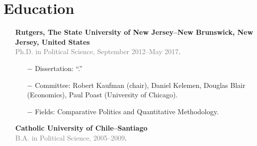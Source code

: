 \section*{Education}

\begin{itemize}
  \item[\textcolor{gray}{\textbullet}] {\bf Rutgers, The State University of New Jersey--New Brunswick, New Jersey, United States}\\
  \textcolor{gray}{Ph.D. in Political Science, September 2012--May 2017}.
    	\begin{itemize}
      		\item[$-$] Dissertation: ``{\unskip}.''
      		\item[$-$] Committee: Robert Kaufman (chair), Daniel Kelemen, Douglas Blair (Economics), Paul Poast (University of Chicago).
          \item[$-$] Fields: Comparative Politics and Quantitative Methodology.
		  \end{itemize}

\item[\textcolor{gray}{\textbullet}] {\bf Catholic University of Chile--Santiago}\\
\textcolor{gray}{B.A. in Political Science, 2005--2009}.
\end{itemize}
